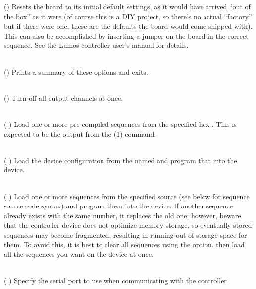\begin{list}{}{}
()
Resets the board to its initial default settings, as it would have arrived ``out of the box''
as it were (of course this is a DIY project, so there's no actual ``factory'' but if there
were one, these are the defaults the board would come shipped with).  This can also be accomplished
by inserting a jumper on the board in the correct sequence.  See the Lumos controller user's manual
for details.
\item[{\codetype{----help}}]\hfill\\
()
Prints a summary of these options and exits.
\item[{\codetype{----kill--all}}]\hfill\\
()
Turn off all output channels at once.
\item[{\codetype{----load--compiled--sequence=}\Var*{file}}]\hfill\\
(
)
Load one or more pre-compiled sequences from the specified hex 
.
This is expected to be the output from the 
(1)
command.
\item[{\codetype{----load--configuration--file=}\Var*{file}}]\hfill\\
(
)
Load the device configuration from the named
and program that into the device.
\item[{\codetype{----load--sequence=}\Var*{file}}]\hfill\\
(
)
Load one or more sequences from the specified source
(see below for sequence source code syntax) and program them
into the device.  If another sequence already exists with the
same number, it replaces the old one; however, beware that the
controller device does not optimize memory storage, so eventually
stored sequences may become fragmented, resulting in running out of
storage space for them.  To avoid this, it is best to clear all
sequences using the
option, then load all the sequences you want on the device at once.
\item[{\codetype{----port=}\Var*{port}}]\hfill\\
(
)
Specify the serial port to use when communicating with the controller

\end{list}
